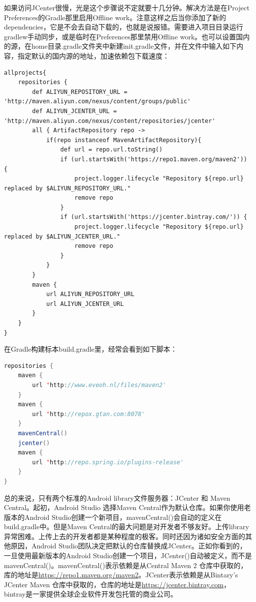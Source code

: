 \documentclass[12pt]{book}
\numberwithin{dummy}{section}
\theoremstyle{ocrenumbox}
\theoremstyle{blacknumex}
\theoremstyle{blacknumbox}
\theoremstyle{ocrenum}
\begin{document}
如果访问JCenter很慢，光是这个步骤说不定就要十几分钟。解决方法是在Project Preferences的Gradle那里启用Offline work。注意这样之后当你添加了新的dependencies，它是不会去自动下载的，也就是说报错。需要进入项目目录运行gradlew手动同步，或是临时在Preferences那里禁用Offline work。也可以设置国内的源，在home目录.gradle文件夹中新建init.gradle文件，并在文件中输入如下内容，指定默认的国内源的地址，加速依赖包下载速度：

\begin{lstlisting}
allprojects{
	repositories {
		def ALIYUN_REPOSITORY_URL = 'http://maven.aliyun.com/nexus/content/groups/public'
		def ALIYUN_JCENTER_URL = 'http://maven.aliyun.com/nexus/content/repositories/jcenter'
		all { ArtifactRepository repo ->
			if(repo instanceof MavenArtifactRepository){
				def url = repo.url.toString()
				if (url.startsWith('https://repo1.maven.org/maven2')) {
					project.logger.lifecycle "Repository ${repo.url} replaced by $ALIYUN_REPOSITORY_URL."
					remove repo
				}
				if (url.startsWith('https://jcenter.bintray.com/')) {
					project.logger.lifecycle "Repository ${repo.url} replaced by $ALIYUN_JCENTER_URL."
					remove repo
				}
			}
		}
		maven {
			url ALIYUN_REPOSITORY_URL
			url ALIYUN_JCENTER_URL
		}
	}
}
\end{lstlisting}

在Gradle构建标本build.gradle里，经常会看到如下脚本：

\begin{lstlisting}[language=Java]
repositories {
	maven {
		url 'http://www.eveoh.nl/files/maven2'
	}
	maven {
		url 'http://repox.gtan.com:8078'
	}
	mavenCentral()
	jcenter()
	maven { 
		url 'http://repo.spring.io/plugins-release' 
	}
}
\end{lstlisting}

总的来说，只有两个标准的Android library文件服务器：JCenter 和 Maven Central。起初，Android Studio 选择Maven Central作为默认仓库。如果你使用老版本的Android Studio创建一个新项目，mavenCentral()会自动的定义在build.gradle中。但是Maven Central的最大问题是对开发者不够友好。上传library异常困难。上传上去的开发者都是某种程度的极客。同时还因为诸如安全方面的其他原因，Android Studio团队决定把默认的仓库替换成JCenter。正如你看到的，一旦使用最新版本的Android Studio创建一个项目，JCenter()自动被定义，而不是mavenCentral()。mavenCentral()表示依赖是从Central Maven 2 仓库中获取的，库的地址是\url{https://repo1.maven.org/maven2}。JCenter表示依赖是从Bintary’s JCenter Maven 仓库中获取的，仓库的地址是\url{https://jcenter.bintray.com}，bintray是一家提供全球企业软件开发包托管的商业公司。
\end{document}
